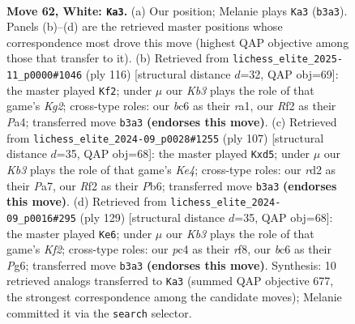 \documentclass[11pt]{article}
\begin{document}
\clearpage

\begin{figure}[p]\centering
\begin{subfigure}{0.46\textwidth}\centering
\resizebox{\linewidth}{!}{%
\newchessgame
\chessboard[
  setfen={8/6k1/1pb5/p7/2p5/1K4PN/2rr1R1P/8 w - - 0 62},
  showmover=false,
  pgfstyle=straightmove, color=movearrow, markmove={b3-a3}
]}
\caption{}
\end{subfigure}\hfill
\begin{subfigure}{0.46\textwidth}\centering
\resizebox{\linewidth}{!}{%
\newchessgame
\chessboard[
  setfen={3N4/P7/5Pp1/6Pk/P7/7p/1R4K1/r6r w - - 0 59},
  showmover=false,
  pgfstyle=straightmove, color=movearrow, markmove={g2-f2}
]}
\caption{}
\end{subfigure}
\\[4pt]
\begin{subfigure}{0.46\textwidth}\centering
\resizebox{\linewidth}{!}{%
\newchessgame
\chessboard[
  setfen={8/p7/1p2R3/3Pkr2/1P5R/P3n3/7K/8 b - - 8 54},
  showmover=false,
  pgfstyle=straightmove, color=movearrow, markmove={e5-d5}
]}
\caption{}
\end{subfigure}\hfill
\begin{subfigure}{0.46\textwidth}\centering
\resizebox{\linewidth}{!}{%
\newchessgame
\chessboard[
  setfen={5RR1/5k2/6p1/4p2p/7P/1r4P1/6K1/r7 b - - 1 65},
  showmover=false,
  pgfstyle=straightmove, color=movearrow, markmove={f7-e6}
]}
\caption{}
\end{subfigure}
\caption{\textbf{Move 62, White: \texttt{Ka3}.} (a) Our position; Melanie plays \texttt{Ka3} (\texttt{b3a3}). Panels (b)--(d) are the retrieved master positions whose correspondence most drove this move (highest QAP objective among those that transfer to it). (b) Retrieved from \texttt{lichess\_elite\_2025-11\_p0000\#1046} (ply 116) [structural distance $d$=32, QAP obj=69]: the master played \texttt{Kf2}; under $\mu$ our \emph{Kb3} plays the role of that game's \emph{Kg2}; cross-type roles: our \emph{b}c6 as their \emph{r}a1, our \emph{R}f2 as their \emph{P}a4; transferred move \texttt{b3a3} \textbf{(endorses this move)}. (c) Retrieved from \texttt{lichess\_elite\_2024-09\_p0028\#1255} (ply 107) [structural distance $d$=35, QAP obj=68]: the master played \texttt{Kxd5}; under $\mu$ our \emph{Kb3} plays the role of that game's \emph{Ke4}; cross-type roles: our \emph{r}d2 as their \emph{P}a7, our \emph{R}f2 as their \emph{P}b6; transferred move \texttt{b3a3} \textbf{(endorses this move)}. (d) Retrieved from \texttt{lichess\_elite\_2024-09\_p0016\#295} (ply 129) [structural distance $d$=35, QAP obj=68]: the master played \texttt{Ke6}; under $\mu$ our \emph{Kb3} plays the role of that game's \emph{Kf2}; cross-type roles: our \emph{p}c4 as their \emph{r}f8, our \emph{b}c6 as their \emph{P}g6; transferred move \texttt{b3a3} \textbf{(endorses this move)}. Synthesis: 10 retrieved analogs transferred to \texttt{Ka3} (summed QAP objective 677, the strongest correspondence among the candidate moves); Melanie committed it via the \texttt{search} selector.}
\label{fig:thought-m122}
\end{figure}
\end{document}
